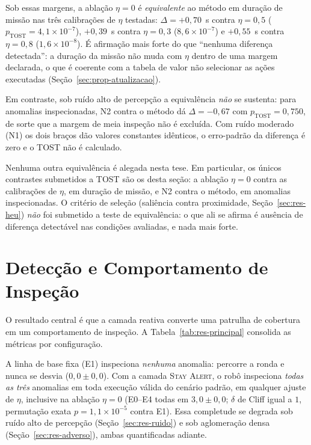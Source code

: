 Sob essas margens, a ablação $\eta=0$ é \emph{equivalente} ao método em duração de
missão nas três calibrações de $\eta$ testadas: $\Delta=+0{,}70$~s contra $\eta=0{,}5$
($p_{\mathrm{TOST}}=4{,}1\times10^{-7}$), $+0{,}39$~s contra $\eta=0{,}3$
($8{,}6\times10^{-7}$) e $+0{,}55$~s contra $\eta=0{,}8$ ($1{,}6\times10^{-8}$). É
afirmação mais forte do que ``nenhuma diferença detectada'': a duração da missão não
muda com $\eta$ dentro de uma margem declarada, o que é coerente com a tabela de
valor não selecionar as ações executadas (Seção~\ref{sec:prop-atualizacao}).

Em contraste, sob ruído alto de percepção a equivalência \emph{não} se sustenta: para
anomalias inspecionadas, N2 contra o método dá $\Delta=-0{,}67$ com
$p_{\mathrm{TOST}}=0{,}750$, de sorte que a margem de meia inspeção não é excluída.
Com ruído moderado (N1) os dois braços dão valores constantes idênticos, o erro-padrão
da diferença é zero e o TOST não é calculado.

Nenhuma outra equivalência é alegada nesta tese. Em particular, os únicos contrastes
submetidos a TOST são os desta seção: a ablação $\eta=0$ contra as calibrações de
$\eta$, em duração de missão, e N2 contra o método, em anomalias inspecionadas. O
critério de seleção (saliência contra proximidade, Seção~\ref{sec:res-heu})
\emph{não} foi submetido a teste de equivalência: o que ali se afirma é ausência de
diferença detectável nas condições avaliadas, e nada mais forte.

\section{Detecção e Comportamento de Inspeção}
\label{sec:res-inspecao}

O resultado central é que a camada reativa converte uma patrulha de cobertura em um
comportamento de inspeção. A Tabela~\ref{tab:res-principal} consolida as métricas
por configuração.

A linha de base fixa (E1) inspeciona \emph{nenhuma} anomalia: percorre a ronda e
nunca se desvia ($0{,}0\pm0{,}0$). Com a camada \textsc{Stay Alert}, o robô
inspeciona \emph{todas as três} anomalias em toda execução válida do cenário padrão,
em qualquer ajuste de $\eta$, inclusive na ablação $\eta=0$ (E0--E4 todas em
$3{,}0\pm0{,}0$; $\delta$ de Cliff igual a $1$, permutação exata
$p=1{,}1\times10^{-5}$ contra E1). Essa completude se degrada sob ruído alto de
percepção (Seção~\ref{sec:res-ruido}) e sob aglomeração densa
(Seção~\ref{sec:res-adverso}), ambas quantificadas adiante.

